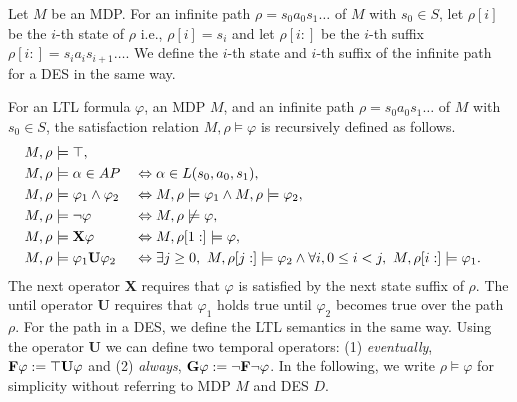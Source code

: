 Let $ M $ be an MDP.
For an infinite path $\rho = s_0a_0s_1 \ldots $ of $ M $ with $ s_0 \in S $, let $\rho[i]$ be the $i$-th state of $\rho$ i.e., $\rho[i]=s_i$ and let $\rho[i:]$ be the $i$-th suffix $\rho[i:]=s_ia_is_{i+1} \ldots $. We define the $i$-th state and $i$-th suffix of the infinite path for a DES in the same way.
\begin{definition}
	For an LTL formula $\varphi$, an MDP $M$, and an infinite path $\rho = s_0a_0s_1 \ldots$ of $ M $ with $ s_0 \in S $, the satisfaction relation $M,\rho \models \varphi$ is recursively defined as follows.
	\begin{alignat}{2}
	& M, \rho \models \top,\nonumber \\
	& M, \rho \models \alpha \in AP &&\Leftrightarrow \alpha \in L(s_0,a_0,s_1),\nonumber \\
	& M, \rho \models \varphi_1 \land \varphi_2 &&\Leftrightarrow M, \rho \models \varphi_1 \land M, \rho \models \varphi_2,\nonumber \\
	& M, \rho \models \neg \varphi &&\Leftrightarrow M, \rho \not\models \varphi,\nonumber \\
	& M, \rho \models \text{{\bf X}}\varphi &&\Leftrightarrow M, \rho[1:] \models \varphi,\nonumber \\
	& M, \rho \models \varphi_1 \text{{\bf U}} \varphi_2 &&\Leftrightarrow \exists j \geq 0, \ M, \rho[j:] \models \varphi_2 \land \forall i, 0\leq i < j, \ M, \rho[i:] \models \varphi_1.\nonumber
	\end{alignat}
The next operator {\bf X} requires that $\varphi$ is satisfied by the next state suffix of $\rho$. The until operator {\bf U} requires that $\varphi_1$ holds true until $\varphi_2$ becomes true over the path $\rho$. For the path in a DES, we define the LTL semantics in the same way.
Using the operator {\bf U} we can define two temporal operators: (1) {\it eventually}, $\text{{\bf F}} \varphi := \top \text{{\bf U}} \varphi $ and (2) {\it always}, $\text{{\bf G}} \varphi := \neg \text{{\bf F}} \neg \varphi$.
In the following, we write $ \rho \models \varphi $ for simplicity without referring to MDP $ M $ and DES $D$.



\end{definition}
